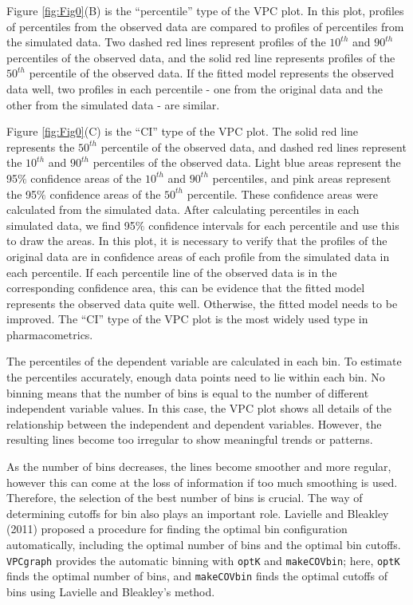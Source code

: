 Figure \ref{fig:Fig0}(B) is the ``percentile'' type of the VPC plot. In this plot, profiles of percentiles from the observed data are compared to profiles of percentiles from the simulated data. Two dashed red lines represent profiles of the \(10^{th}\) and \(90^{th}\) percentiles of the observed data, and the solid red line represents profiles of the \(50^{th}\) percentile of the observed data. If the fitted model represents the observed data well, two profiles in each percentile - one from the original data and the other from the simulated data - are similar.

Figure \ref{fig:Fig0}(C) is the ``CI'' type of the VPC plot. The solid red line represents the \(50^{th}\) percentile of the observed data, and dashed red lines represent the \(10^{th}\) and \(90^{th}\) percentiles of the observed data. Light blue areas represent the 95\(\%\) confidence areas of the \(10^{th}\) and \(90^{th}\) percentiles, and pink areas represent the 95\(\%\) confidence areas of the \(50^{th}\) percentile. These confidence areas were calculated from the simulated data. After calculating percentiles in each simulated data, we find 95\(\%\) confidence intervals for each percentile and use this to draw the areas. In this plot, it is necessary to verify that the profiles of the original data are in confidence areas of each profile from the simulated data in each percentile. If each percentile line of the observed data is in the corresponding confidence area, this can be evidence
that the fitted model represents the observed data quite well. Otherwise, the fitted model needs to be improved. The ``CI'' type of the VPC plot is the most widely used type in pharmacometrics.

The percentiles of the dependent variable are calculated in each bin. To estimate the percentiles accurately, enough data points need to lie within each bin. No binning means that the number of bins is equal to the number of different independent variable values. In this case, the VPC plot shows all details of the relationship between the independent and dependent variables. However, the resulting lines become too irregular to show meaningful trends or patterns.

As the number of bins decreases, the lines become smoother and more regular, however this can come at the loss of information if too much smoothing is used. Therefore, the selection of the best number of bins is crucial. The way of determining cutoffs for bin also plays an important role. Lavielle and Bleakley (2011) proposed a procedure for finding the optimal bin configuration automatically, including the optimal number of bins and the optimal bin cutoffs.
\texttt{VPCgraph} provides the automatic binning with \texttt{optK} and \texttt{makeCOVbin}; here, \texttt{optK} finds the optimal number of bins, and \texttt{makeCOVbin} finds the optimal cutoffs of bins using Lavielle and Bleakley's method.


